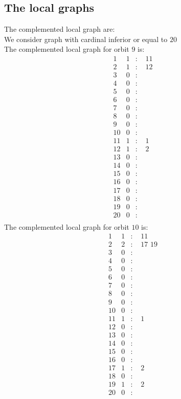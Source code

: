 \documentclass[12pt]{article}
\begin{document}
\subsection{The local graphs}
The complemented local graph are:\\
We consider graph with cardinal inferior or equal to $20$\\
The complemented local graph for orbit $9$ is:
\begin{equation*}
\begin{array}{rrcl}
1&1&:&\,\,11\\
2&1&:&\,\,12\\
3&0&:&\\
4&0&:&\\
5&0&:&\\
6&0&:&\\
7&0&:&\\
8&0&:&\\
9&0&:&\\
10&0&:&\\
11&1&:&\,\,1\\
12&1&:&\,\,2\\
13&0&:&\\
14&0&:&\\
15&0&:&\\
16&0&:&\\
17&0&:&\\
18&0&:&\\
19&0&:&\\
20&0&:&\\
\end{array}
\end{equation*}
The complemented local graph for orbit $10$ is:
\begin{equation*}
\begin{array}{rrcl}
1&1&:&\,\,11\\
2&2&:&\,\,17\,\,19\\
3&0&:&\\
4&0&:&\\
5&0&:&\\
6&0&:&\\
7&0&:&\\
8&0&:&\\
9&0&:&\\
10&0&:&\\
11&1&:&\,\,1\\
12&0&:&\\
13&0&:&\\
14&0&:&\\
15&0&:&\\
16&0&:&\\
17&1&:&\,\,2\\
18&0&:&\\
19&1&:&\,\,2\\
20&0&:&\\
\end{array}
\end{equation*}
\end{document}
